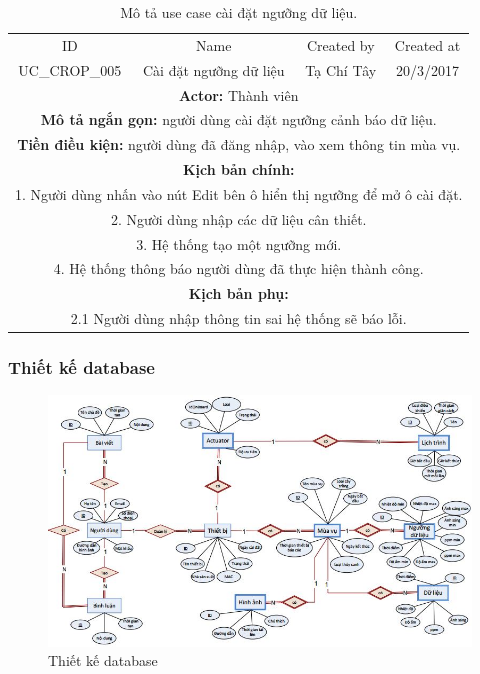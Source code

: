 \documentclass[a4paper,12pt,oneside]{article}
\begin{document}
\newpage
\begin{table}[!htp]
\centering
\begin{tabularx}{\linewidth}{ |c||c|c|c| }
\hline
ID & Name & Created by & Created at\\
UC\_CROP\_005 & Cài đặt ngưỡng dữ liệu & Tạ Chí Tây & 20/3/2017\\
\hline
\multicolumn{4}{|X|}{\textbf{Actor:} Thành viên }\\
\hline
\multicolumn{4}{|X|}{\textbf{Mô tả ngắn gọn:} người dùng cài đặt ngưỡng cảnh báo dữ liệu. }\\
\hline
\multicolumn{4}{|X|}{\textbf{Tiền điều kiện:} người dùng đã đăng nhập, vào xem thông tin mùa vụ.}\\
\hline
\multicolumn{4}{|X|}{\textbf{Kịch bản chính:}}\\
\multicolumn{4}{|X|}{ 1.	Người dùng nhấn vào nút Edit bên ô hiển thị ngưỡng để mở ô cài đặt.}\\
\multicolumn{4}{|X|}{
2.	Người dùng nhập các dữ liệu cân thiết.}\\
\multicolumn{4}{|X|}{
3.	Hệ thống tạo một ngưỡng mới.}\\

\multicolumn{4}{|X|}{4. Hệ thống thông báo người dùng đã thực hiện thành công.}\\
\hline
\multicolumn{4}{|X|}{\textbf{Kịch bản phụ:}}\\
\multicolumn{4}{|X|}{2.1    Người dùng nhập thông tin sai hệ thống sẽ báo lỗi.}\\
\hline

\end{tabularx}
\caption{Mô tả use case cài đặt ngưỡng dữ liệu.}
\end{table}

\subsubsection{Thiết kế database}

\begin{landscape}
\begin{figure}[b]
	\includegraphics[scale=1.1]{hinh/database.jpg}
	\caption{ Thiết kế database}
	\label{xyz}
\end{figure}
\end{landscape}
\end{document}
